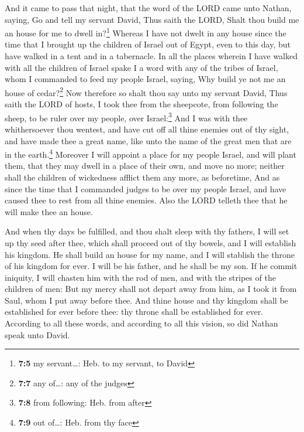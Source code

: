  And it came to pass that night, that the word of the LORD
came unto Nathan, saying,  Go and tell my servant David,
Thus saith the LORD, Shalt thou build me an house for me to dwell
in?\footnote{\textbf{7:5} my servant\ldots: Heb. to my servant, to David}
 Whereas I have not dwelt in any house since the time that
I brought up the children of Israel out of Egypt, even to this day, but
have walked in a tent and in a tabernacle.  In all the
places wherein I have walked with all the children of Israel spake I a
word with any of the tribes of Israel, whom I commanded to feed my
people Israel, saying, Why build ye not me an house of cedar?\footnote{\textbf{7:7}
  any of\ldots: any of the judges}  Now therefore so shalt
thou say unto my servant David, Thus saith the LORD of hosts, I took
thee from the sheepcote, from following the sheep, to be ruler over my
people, over Israel:\footnote{\textbf{7:8} from following: Heb. from
  after}  And I was with thee whithersoever thou wentest,
and have cut off all thine enemies out of thy sight, and have made thee
a great name, like unto the name of the great men that are in the
earth.\footnote{\textbf{7:9} out of\ldots: Heb. from thy face}
 Moreover I will appoint a place for my people Israel,
and will plant them, that they may dwell in a place of their own, and
move no more; neither shall the children of wickedness afflict them any
more, as beforetime,  And as since the time that I
commanded judges to be over my people Israel, and have caused thee to
rest from all thine enemies. Also the LORD telleth thee that he will
make thee an house.

 And when thy days be fulfilled, and thou shalt sleep
with thy fathers, I will set up thy seed after thee, which shall proceed
out of thy bowels, and I will establish his kingdom.  He
shall build an house for my name, and I will stablish the throne of his
kingdom for ever.  I will be his father, and he shall be
my son. If he commit iniquity, I will chasten him with the rod of men,
and with the stripes of the children of men:  But my
mercy shall not depart away from him, as I took it from Saul, whom I put
away before thee.  And thine house and thy kingdom shall
be established for ever before thee: thy throne shall be established for
ever.  According to all these words, and according to all
this vision, so did Nathan speak unto David.

